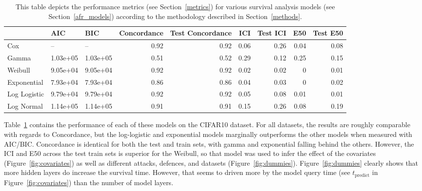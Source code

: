 \begin{table}[b!]
\centering
\begin{tabular}{lllrrrrrr}
\toprule
 & AIC & BIC & Concordance & Test Concordance & ICI & Test ICI & E50 & Test E50 \\
\midrule
Cox & -- & -- & 0.92 & 0.92 & 0.06 & 0.26 & 0.04 & 0.08 \\
Gamma & 1.03e+05 & 1.03e+05 & 0.51 & 0.52 & 0.29 & 0.12 & 0.25 & 0.15 \\
Weibull & 9.05e+04 & 9.05e+04 & 0.92 & 0.92 & 0.02 & 0.02 & 0 & 0.01 \\
Exponential & 7.93e+04 & 7.93e+04 & 0.86 & 0.86 & 0.04 & 0.03 & 0 & 0.02 \\
Log Logistic & 9.79e+04 & 9.79e+04 & 0.92 & 0.92 & 0.05 & 0.08 & 0.01 & 0.01 \\
Log Normal & 1.14e+05 & 1.14e+05 & 0.91 & 0.91 & 0.15 & 0.26 & 0.08 & 0.19 \\
\bottomrule
\end{tabular}
\caption{This table depicts the performance metrics (see Section~\ref{metrics}) for various survival analysis models (see Section~\ref{afr_models}) according to the methodology described in Section~\ref{methods}.}
\label{tab:afr_models}
\end{table}

Table~\ref{tab:afr_models} contains the performance of each of these models on the CIFAR10 dataset. For all datasets, the results are roughly comparable with regards to Concordance, but the log-logistic and exponential models marginally outperforms the other models when measured with AIC/BIC. Concordance is identical for both the test and train sets, with gamma and exponential falling behind the others. However, the ICI and E50 across the test train sets is superior for the Weibull, so that model was used to infer the effect of the covariates (Figure~\ref{fig:covariates}) as well as different attacks, defences, and datasets (Figure~\ref{fig:dummies}). Figure~\ref{fig:dummies} clearly shows that more hidden layers do increase the survival time. However, that seems to driven more by the model query time (see $t_{\mathrm{predict}}$ in Figure~\ref{fig:covariates}) than the number of model layers.

